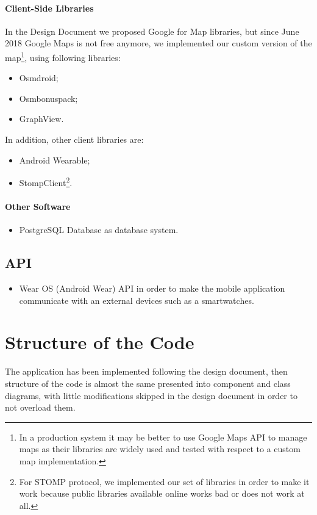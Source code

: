 \documentclass[a4paper]{article}
\begin{document}
\newpage
\paragraph{Client-Side Libraries}
In the Design Document we proposed Google for Map libraries, but since June 2018 Google Maps is not free anymore, we implemented our custom version  of the map\footnote{In a production system it may be better to use Google Maps API to manage maps as their libraries are widely used and tested with respect to a custom map implementation.}, using following libraries:
\begin{itemize}
    \item Osmdroid;
    \item Osmbonuspack;
    \item GraphView.
\end{itemize}
In addition, other client libraries are:
\begin{itemize}    
    \item Android Wearable;
    \item StompClient\footnote{For STOMP protocol, we implemented our set of libraries in order to make it work because public libraries available online works bad or does not work at all.}.
\end{itemize}

\paragraph{Other Software}
\begin{itemize}
    \item PostgreSQL Database as database system.
\end{itemize}

\subsection{API}
\begin{itemize}
    \item Wear OS (Android Wear) API in order to make the mobile application communicate with an external devices such as a smartwatches.
\end{itemize}

\newpage
\section{Structure of the Code}
The application has been implemented following the design document, then structure of the code is almost the same presented into component and class diagrams, with little modifications skipped in the design document in order to not overload them.
\end{document}
